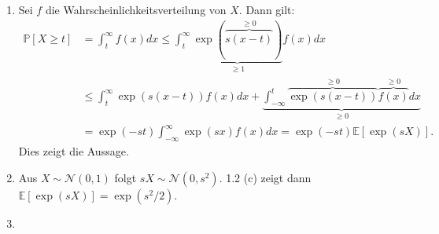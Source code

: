 \documentclass{article}
\begin{document}
\begin{enumerate}[label=(\alph*)]
	\item Sei $f$ die Wahrscheinlichkeitsverteilung von $X$. Dann gilt:
	      \begin{align*}
		      \mathds{P}[X \geq t] & = \int_{t}^{\infty} f(x) dx \leq \int_{t}^{\infty} \underbrace{\exp(\overbrace{s(x-t)}^{\geq 0})}_{\geq 1} f(x) dx                                    \\
		                           & \leq \int_{t}^{\infty} \exp(s(x-t)) f(x) dx + \underbrace{\int_{-\infty}^{t} \overbrace{\exp(s(x-t))}^{\geq 0} \overbrace{f(x)}^{\geq 0} dx}_{\geq 0} \\
		                           & = \exp(-st) \int_{-\infty}^{\infty} \exp(sx) f(x) dx = \exp(-st) \mathds{E}[\exp(sX)]\text{.}
	      \end{align*}
	      Dies zeigt die Aussage.
	\item Aus $X \sim \mathcal{N}(0,1)$ folgt $sX \sim \mathcal{N}(0,s^2)$. 1.2 (c) zeigt dann $\mathds{E}[\exp(sX)] = \exp(s^2/2)$.
	\item
\end{enumerate}

\subsection{}
\end{document}
